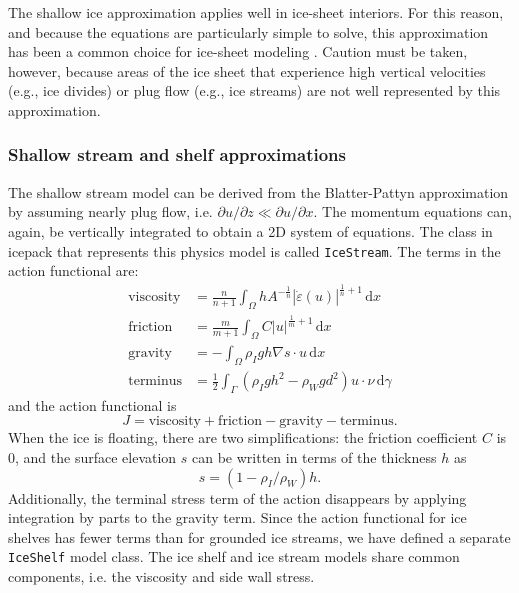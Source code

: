 \documentclass{article}
\theoremstyle{definition}
\theoremstyle{plain}
\newcommand{\ud}{\hspace{2pt}\mathrm{d}}
\begin{document}
The shallow ice approximation applies well in ice-sheet interiors.
For this reason, and because the equations are particularly simple to solve, this approximation has been a common choice for ice-sheet modeling \citep{kirchner2016shallow}.
Caution must be taken, however, because areas of the ice sheet that experience high vertical velocities (e.g., ice divides) or plug flow (e.g., ice streams) are not well represented by this approximation.

\subsubsection{Shallow stream and shelf approximations}

The shallow stream model can be derived from the Blatter-Pattyn approximation by assuming nearly plug flow, i.e. $\partial u/\partial z \ll \partial u/\partial x$.
The momentum equations can, again, be vertically integrated to obtain a 2D system of equations.
The class in icepack that represents this physics model is called \texttt{IceStream}.
The terms in the action functional are:
\begin{align}
    \text{viscosity} & = \frac{n}{n + 1}\int_\Omega hA^{-\frac{1}{n}}|\dot\varepsilon(u)|^{\frac{1}{n} + 1}\ud x \\
    \text{friction} & = \frac{m}{m + 1}\int_\Omega C|u|^{\frac{1}{m} + 1}\ud x \\
    \text{gravity} & = -\int_\Omega\rho_I gh\nabla s\cdot u\ud x \\
    \text{terminus} & = \frac{1}{2}\int_\Gamma(\rho_I gh^2 - \rho_Wgd^2)u\cdot \nu\ud\gamma
\end{align}
and the action functional is
\begin{equation}
    J = \text{viscosity} + \text{friction} - \text{gravity} - \text{terminus}.
\end{equation}
When the ice is floating, there are two simplifications: the friction coefficient $C$ is 0, and the surface elevation $s$ can be written in terms of the thickness $h$ as
\begin{equation}
    s = (1 - \rho_I / \rho_W)h.
\end{equation}
Additionally, the terminal stress term of the action disappears by applying integration by parts to the gravity term.
Since the action functional for ice shelves has fewer terms than for grounded ice streams, we have defined a separate \texttt{IceShelf} model class.
The ice shelf and ice stream models share common components, i.e. the viscosity and side wall stress.
\end{document}
